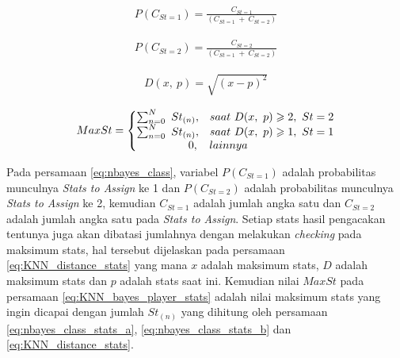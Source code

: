 \begin{equation}\label{eq:nbayes_class_stats_a}
\begin{split}
P(C_{St = 1}) = \frac{C_{St = 1}}{(C_{St = 1}\ +\ C_{St = 2})}
\end{split}
\end{equation}

\begin{equation}\label{eq:nbayes_class_stats_b}
\begin{split}
P(C_{St = 2}) = \frac{C_{St = 2}}{(C_{St = 1}\ +\ C_{St = 2})}
\end{split}
\end{equation}

\begin{equation}\label{eq:KNN_distance_stats}
\begin{split}
D(x,\ p) = \sqrt{(x - p)^2}
\end{split}
\end{equation}

\begin{equation}\label{eq:KNN_bayes_player_stats}
\begin{split}
MaxSt = \left\{\begin{matrix}
\sum_{n = 0}^{N}\ St_{(n)}, & saat\ D(x,\ p) \geqslant 2,\ St = 2 \\ 
\sum_{n = 0}^{N}\ St_{(n)}, & saat\ D(x,\ p) \geqslant 1,\ St = 1 \\
\hspace{4.5em} 0, 			& \hspace{-7.8em} lainnya
\end{matrix}\right.
\end{split}
\end{equation}

Pada persamaan \ref{eq:nbayes_class}, variabel $P(C_{St = 1})$ adalah probabilitas munculnya \textit{Stats to Assign} ke 1 dan $P(C_{St = 2})$ adalah probabilitas munculnya \textit{Stats to Assign} ke 2, kemudian $C_{St = 1}$ adalah jumlah angka satu dan $C_{St = 2}$ adalah jumlah angka satu pada \textit{Stats to Assign}. Setiap stats hasil pengacakan tentunya juga akan dibatasi jumlahnya dengan melakukan \textit{checking} pada maksimum stats, hal tersebut dijelaskan pada persamaan \ref{eq:KNN_distance_stats} yang mana $x$ adalah maksimum stats, $D$ adalah maksimum stats dan $p$ adalah stats saat ini. Kemudian nilai $MaxSt$ pada persamaan \ref{eq:KNN_bayes_player_stats} adalah nilai maksimum stats yang ingin dicapai dengan jumlah $St_{(n)}$ yang dihitung oleh persamaan \ref{eq:nbayes_class_stats_a}, \ref{eq:nbayes_class_stats_b} dan \ref{eq:KNN_distance_stats}.
\vspace{1ex}

